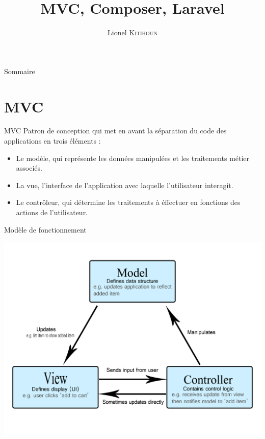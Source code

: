 \documentclass{beamer}
\title{MVC, Composer, Laravel}
\date{}
\author{Lionel \textsc{Kitihoun}}
\begin{document}
\begin{frame}[plain]
\maketitle
\end{frame}

\begin{frame}{Sommaire}
\tableofcontents
\end{frame}

\section{MVC}
\begin{frame}{MVC}
  Patron de conception qui met en avant la séparation du code des applications en trois éléments :
  \begin{itemize}
    \item Le modèle, qui représente les données manipulées et les traitements métier associés.
    \item La vue, l'interface de l'application avec laquelle l'utilisateur interagit.
    \item Le contrôleur, qui détermine les traitements à éffectuer en fonctions des actions de l'utilisateur.
  \end{itemize}
\end{frame}

\begin{frame}{Modèle de fonctionnement}
  \begin{center}
    \includegraphics[scale=0.6]{images/mvc-light-blue.png}
  \end{center}
\end{frame}
\end{document}

